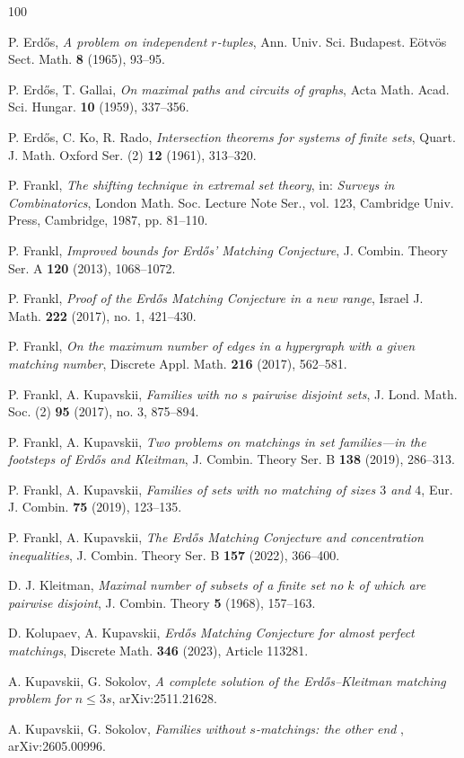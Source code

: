 \documentclass{article}
\begin{document}
\begin{thebibliography}{100}


P. Erd\H{o}s,
\textit{A problem on independent $r$-tuples},
Ann. Univ. Sci. Budapest. E\"otv\"os Sect. Math. \textbf{8} (1965), 93--95.

P. Erd\H{o}s, T. Gallai,
\textit{On maximal paths and circuits of graphs},
Acta Math. Acad. Sci. Hungar. \textbf{10} (1959), 337--356.

P. Erd\H{o}s, C. Ko, R. Rado,
\textit{Intersection theorems for systems of finite sets},
Quart. J. Math. Oxford Ser. (2) \textbf{12} (1961), 313--320.

P. Frankl,
\textit{The shifting technique in extremal set theory},
in: \textit{Surveys in Combinatorics}, London Math. Soc. Lecture Note Ser., vol. 123,
Cambridge Univ. Press, Cambridge, 1987, pp. 81--110.

P. Frankl,
\textit{Improved bounds for Erd\H{o}s' Matching Conjecture},
J. Combin. Theory Ser. A \textbf{120} (2013), 1068--1072.

P. Frankl,
\textit{Proof of the Erd\H{o}s Matching Conjecture in a new range},
Israel J. Math. \textbf{222} (2017), no. 1, 421--430.

P. Frankl,
\textit{On the maximum number of edges in a hypergraph with a given matching number},
Discrete Appl. Math. \textbf{216} (2017), 562--581.

P. Frankl, A. Kupavskii,
\textit{Families with no $s$ pairwise disjoint sets},
J. Lond. Math. Soc. (2) \textbf{95} (2017), no. 3, 875--894.

P. Frankl, A. Kupavskii,
\textit{Two problems on matchings in set families---in the footsteps of Erd\H{o}s and Kleitman},
J. Combin. Theory Ser. B \textbf{138} (2019), 286--313.

P. Frankl, A. Kupavskii,
\textit{Families of sets with no matching of sizes $3$ and $4$},
Eur. J. Combin. \textbf{75} (2019), 123--135.

P. Frankl, A. Kupavskii,
\textit{The Erd\H{o}s Matching Conjecture and concentration inequalities},
J. Combin. Theory Ser. B \textbf{157} (2022), 366--400.


D. J. Kleitman,
\textit{Maximal number of subsets of a finite set no $k$ of which are pairwise disjoint},
J. Combin. Theory \textbf{5} (1968), 157--163.

D. Kolupaev, A. Kupavskii,
\textit{Erd\H{o}s Matching Conjecture for almost perfect matchings},
Discrete Math. \textbf{346} (2023), Article 113281.

A. Kupavskii, G. Sokolov,
\textit{A complete solution of the Erd\H{o}s--Kleitman matching problem for $n\le 3s$},
arXiv:2511.21628.

A. Kupavskii, G. Sokolov,
\textit{Families without $s$-matchings: the other end
}, arXiv:2605.00996.


\end{thebibliography}
\end{document}
